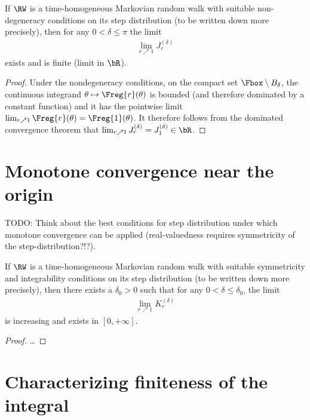 \begin{lemma}
  \label{lem:integral_away}
  If $\RW$ is a time-homogeneous Markovian random walk with suitable
  non-degeneracy conditions on its step distribution (to be written down more precisely),
  then for any $0 < \delta \le \pi$ the limit
  \begin{align*}
  \lim_{r \nearrow 1} J_r^{(\delta)}
  \end{align*}
  exists and is finite (limit in $\bR$).
\end{lemma}
\begin{proof}
Under the nondegeneracy conditions, on the compact set $\Fbox \setminus B_\delta$,
the continuous integrand $\theta \mapsto \Freg{r}(\theta)$
is bounded (and therefore dominated by a constant function) and
it has the pointwise limit $\lim_{r \nearrow 1} \Freg{r}(\theta) = \Freg{1}(\theta)$.
It therefore follows from the dominated convergence theorem
that $\lim_{r \nearrow 1} J_r^{(\delta)} = J_1^{(\delta)} \in \bR$.
\end{proof}

\section{Monotone convergence near the origin}

TODO: Think about the best conditions for step distribution under which monotone convergence can be applied (real-valuedness requires symmetricity of the step-distribution?!?).

\begin{lemma}
  \label{lem:integral_near}
  If $\RW$ is a time-homogeneous Markovian random walk with suitable
  symmetricity and integrability conditions on its step distribution (to be written down more precisely),
  then there exists a $\delta_0 > 0$ such that for any $0 < \delta \le \delta_0$, the limit
  \begin{align*}
  \lim_{r \nearrow 1} K_r^{(\delta)}
  \end{align*}
  is increasing and exists in $[0,+\infty]$.
\end{lemma}
\begin{proof}
\ldots
\end{proof}


\section{Characterizing finiteness of the integral}
